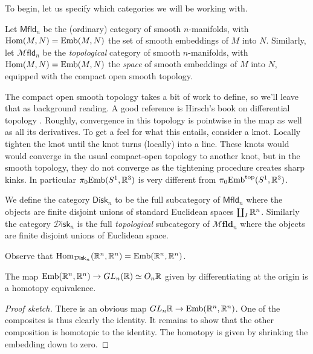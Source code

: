 \documentclass{amsart}
\DeclareMathOperator{\Emb}{Emb}
\begin{document}
To begin, let us specify which categories we will be working with.
\begin{definition}
    Let $\mathsf{Mfld}_n$ be the (ordinary) category of smooth $n$-manifolds, with
    $\Hom(M,N)=\Emb(M,N)$ the set of smooth embeddings of $M$ into $N$.
    Similarly, 
    let $\mathcal{M}\mathsf{fld}_n$ be the \textit{topological} category of smooth $n$-manifolds, with
    $\Hom(M,N)=\Emb(M,N)$ the \textit{space} of smooth embeddings of $M$ into $N$, equipped with the
    compact open smooth topology.
\end{definition}

The compact open smooth topology takes a bit of work to define, so we'll leave that
as background reading. A good reference is Hirsch's book on differential topology \cite{hirsch}.
Roughly, convergence in this topology is pointwise in the map as well as all its derivatives.
To get a feel for what this entails, consider a knot. Locally tighten the knot
until the knot turns (locally) into a line. These knots would would converge in the usual compact-open
topology to another knot, but in the smooth topology, they do not converge as the
tightening procedure creates sharp kinks.
In particular $\pi_0\text{Emb}(S^1,\mathbb{R}^3)$ is very different from
$\pi_0\text{Emb}^\text{top}(S^1,\mathbb{R}^3)$.

\begin{definition}
    We define the category $\mathsf{Disk}_n$ to be the full subcategory of
    $\mathsf{Mfld}_n$ where the objects are finite disjoint unions of standard
    Euclidean spaces $\coprod_I\mathbb{R}^n$. Similarly the category $\mathcal{D}\mathsf{isk}_n$
    is the full \textit{topological} subcategory of $\mathcal{M}\mathbf{fld}_n$ where the objects
    are finite disjoint unions of Euclidean space.
\end{definition}

Observe that $\operatorname{Hom}_{\mathcal{D}\mathsf{isk}_n}(\mathbb{R}^n,\mathbb{R}^n)=\text{Emb}(\mathbb{R}^n,\mathbb{R}^n)$.
\begin{lemma}
    The map $\Emb(\R^n,\R^n)\to GL_n(\R)\simeq O_n\R$ given by differentiating
    at the origin is a homotopy equivalence.
\end{lemma}
\begin{proof}[Proof sketch]
    There is an obvious map $GL_n\R \to \Emb(\R^n,\R^n)$. One of the composites is
    thus clearly the identity. It remains to show that the other composition is
    homotopic to the identity. The homotopy is given by shrinking the embedding
    down to zero.
\end{proof}
\end{document}
